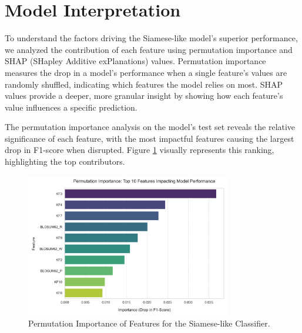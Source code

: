 \documentclass{article}
\begin{document}
\begin{table}[h!]
\centering
{}
\caption{Comparative Summary of Model Performance on Test Set}
\label{tab:all_model_performance}
\end{table}

\section{Model Interpretation}
To understand the factors driving the Siamese-like model's superior performance, we analyzed the contribution of each feature using permutation importance and SHAP (SHapley Additive exPlanations) values. Permutation importance measures the drop in a model's performance when a single feature's values are randomly shuffled, indicating which features the model relies on most. SHAP values provide a deeper, more granular insight by showing how each feature's value influences a specific prediction.

The permutation importance analysis on the model's test set reveals the relative significance of each feature, with the most impactful features causing the largest drop in F1-score when disrupted. Figure \ref{fig:permutation_importance} visually represents this ranking, highlighting the top contributors.

\begin{figure}[h!]
\centering
\includegraphics[width=0.8\textwidth]{images/12.png}
\caption{Permutation Importance of Features for the Siamese-like Classifier.}
\label{fig:permutation_importance}
\end{figure}
\end{document}
